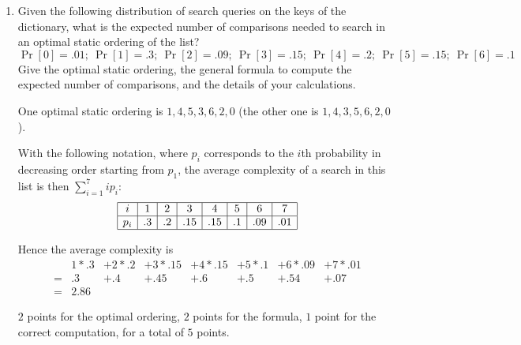 \begin{enumerate}
\begin{solution}
\end{solution}

\item Given the following distribution of search queries on the keys
of the dictionary, what is the expected number of comparisons needed to 
search in an optimal static ordering of the list?
%
$$
\Pr[0]{=}.01;\ 
\Pr[1]{=}.3;\ 
\Pr[2]{=}.09;\ 
\Pr[3]{=}.15;\ 
\Pr[4]{=}.2;\ 
\Pr[5]{=}.15;\ 
\Pr[6]{=}.1
$$
Give the optimal static ordering, the general formula to compute the
expected number of comparisons, and the details of your calculations.

\begin{spaceForAnswer}  

\vfil

\end{spaceForAnswer}
%
\begin{solution}
One optimal static ordering is $1,4,5,3,6,2,0$ (the other one is $1,4,3,5,6,2,0$).

With the following notation, where $p_i$ corresponds to the $i$th
probability in decreasing order starting from $p_1$, the average
complexity of a search in this list is then $\sum_{i=1}^{7} i p_i$:
$$
\begin{array}{|c|c|c|c|c|c|c|c|} \hline
i   & 1  & 2  & 3 & 4 & 5 & 6 & 7 \\ \hline
p_i & .3 & .2 &.15&.15&.1 &.09&.01\\  \hline
\end{array}
$$

Hence the average complexity is 
$$ 
\begin{array}{llllllll}
&   1 * .3
& + 2 * .2
& + 3 * .15
& + 4 * .15
& + 5 * .1
& + 6 * .09
& + 7 * .01
\\
=
&   .3
& + .4
& + .45
& + .6
& + .5
& + .54
& + .07
\\
= 
& 2.86
\end{array}
$$
\end{solution}
\begin{markingScheme}
$2$ points for the optimal ordering,
$2$ points for the formula,
$1$ point for the correct computation,
for a total of $5$ points.
\end{markingScheme}
\end{enumerate}

